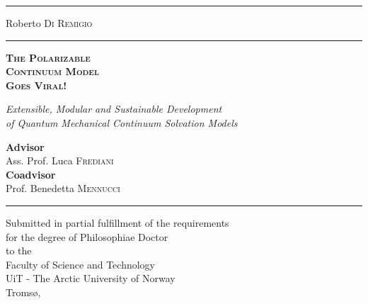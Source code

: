
\newfontfamily{}
\begin{titlepage}
  \begingroup%
  \textheight
  \begin{minipage}[t]{0.05\textwidth}
    \color{brewerBlue}
    \rule{6pt}{\textheight}
  \end{minipage}
  \hspace{0.05\textwidth}
  \begin{minipage}[t]{0.8\textwidth}
    \vspace*{0.5\drop}
    {\LARGE Roberto \textsc{Di Remigio}} \\
    \rule{\textwidth}{1pt} \par
    \vspace{3\baselineskip}
    {\noindent\Cinzel\bfseries\scshape\Huge\color{brewerBlue}
    The Polarizable \\ Continuum Model \\ Goes Viral!} \par
    \vspace{2\baselineskip}
    {\Large\itshape Extensible, Modular and Sustainable Development
    \\
    of Quantum Mechanical Continuum Solvation Models} \par
    \vspace{6.5\baselineskip}
    {
    \large \textbf{Advisor}
    \\
    Ass. Prof. Luca \textsc{Frediani}
    \\[0.1\drop]
    \textbf{Coadvisor}
    \\
    Prof. Benedetta \textsc{Mennucci}
    } \par
    \vspace{\baselineskip}
    \rule{\textwidth}{1pt} \par
    {\small\itshape
    \begin{center}
      Submitted in partial fulfillment of the requirements
      \\
      for the degree of Philosophiae Doctor
      \\[0.1\drop]
      \textnormal{to the}
      \\[0.1\drop]
      Faculty of Science and Technology
      \\
      UiT - The Arctic University of Norway
      \\
      Tromsø, \myTime
    \end{center}
    }
  \end{minipage}
  \endgroup
\end{titlepage}
\restoregeometry
